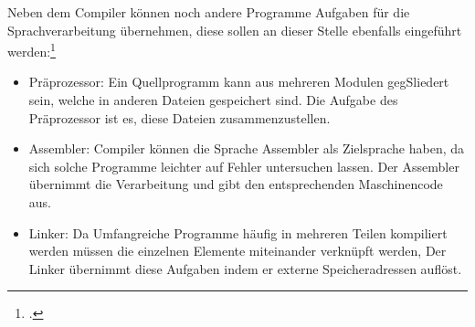 Neben dem Compiler können noch andere Programme Aufgaben für die Sprachverarbeitung übernehmen, diese sollen an dieser Stelle ebenfalls eingeführt werden:\footcite[Vgl.][S. 4f]{Ullmann2008} \\\begin{itemize}
\setlength\itemsep{-1.5em}
\item Präprozessor: Ein Quellprogramm kann aus mehreren Modulen gegSliedert sein, welche in anderen Dateien gespeichert sind. Die Aufgabe des Präprozessor ist es, diese Dateien zusammenzustellen. 
\item Assembler: Compiler können die Sprache Assembler als Zielsprache haben, da sich solche Programme leichter auf Fehler untersuchen lassen. Der Assembler übernimmt die Verarbeitung und gibt den entsprechenden Maschinencode aus.
\item Linker: Da Umfangreiche Programme häufig in mehreren Teilen kompiliert werden müssen die einzelnen Elemente miteinander verknüpft werden, Der Linker übernimmt diese Aufgaben indem er externe Speicheradressen auflöst.
\end{itemize}